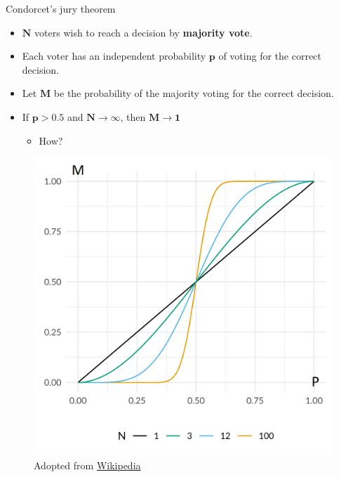 \documentclass[serif, aspectratio=169]{beamer}
\begin{document}
\begin{frame}{Condorcet's jury theorem}
    \begin{itemize}
        \itemsep1em
        \justifying
        \item $\boldsymbol{N}$ voters wish to reach a decision by \textbf{majority vote}.
        \item Each voter has an independent probability $\boldsymbol{p}$ of voting for the correct decision.
        \item Let $\boldsymbol{M}$ be the probability of the majority voting for the correct decision.
        \item \textcolor{deepred}{If $\boldsymbol{p > 0.5}$ and $\boldsymbol{N \to \infty}$, then $\boldsymbol{M \to 1}$}
        \begin{itemize}
            \item How?
        \end{itemize}
    \end{itemize}
    \endminipage
    \hfill
    \begin{figure}[!htb]
        \includegraphics[width=\linewidth]{pic/condorcets.png}
        {\scriptsize Adopted from \href{https://en.wikipedia.org/wiki/Condorcet\%27s_jury_theorem}{Wikipedia}}
    \end{figure}
    \endminipage
\end{frame}
\end{document}
